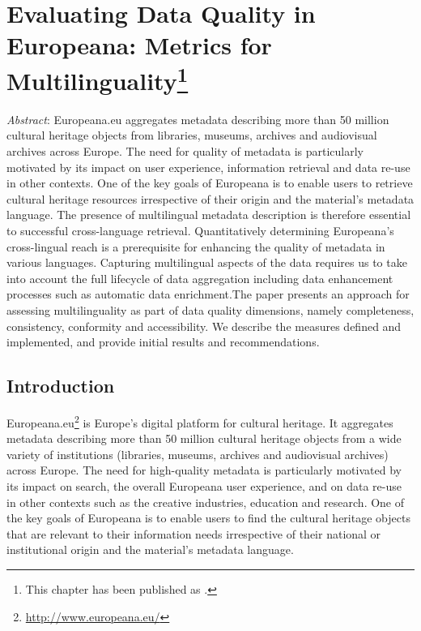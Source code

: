 \chapter[Evaluating Data Quality in Europeana: Metrics for Multilinguality]{Evaluating Data Quality in Europeana: Metrics for Multilinguality\footnote{This chapter has been published as \cite{kiraly-et-al2018}.}}


\emph{Abstract}: Europeana.eu aggregates metadata describing more than 50 million cultural heritage objects from libraries, museums, archives and audiovisual archives across Europe. The need for quality of metadata is particularly motivated by its impact on user experience, information retrieval and data re-use in other contexts. One of the key goals of Europeana is to enable users to retrieve cultural heritage resources irrespective of their origin and the material's metadata language. The presence of multilingual metadata description is therefore essential to successful cross-language retrieval. Quantitatively determining Europeana's cross-lingual reach is a prerequisite for enhancing the quality of metadata in various languages.
% 
% 
Capturing multilingual aspects of the data requires us to take into account the full lifecycle of data aggregation including data enhancement processes such as automatic data enrichment.The paper presents an approach for assessing multilinguality as part of data quality dimensions, namely completeness, consistency, conformity and accessibility. We describe the measures defined and implemented, and provide initial results and recommendations. 


%
\section{Introduction}
Europeana.eu\footnote{\url{http://www.europeana.eu/}} is Europe's digital platform for cultural heritage. It aggregates metadata describing more than 50 million cultural heritage objects from a wide variety of institutions (libraries, museums, archives and audiovisual archives) across Europe. 
The need for high-quality metadata is particularly motivated by its impact on search, the overall Europeana user experience, and on data re-use in other contexts such as the creative industries, education and research. One of the key goals of Europeana is to enable users to find the cultural heritage objects that are relevant to their information needs irrespective of their national or institutional origin and the material's metadata language. 


